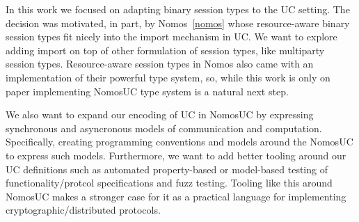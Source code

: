 In this work we focused on adapting binary session types to the UC setting. The decision was motivated, in part, by Nomos~\ref{nomos} whose resource-aware binary session types
fit nicely into the import mechanism in UC.
We want to explore adding import on top of other formulation of session types, like multiparty session types.
Resource-aware session types in Nomos also came with an implementation of their powerful type system, so, while this work is only on paper implementing NomosUC type system is a natural next step.

We also want to expand our encoding of UC in NomosUC by expressing synchronous and asyncronous models of communication and computation. 
Specifically, creating programming conventions and models around the NomosUC to express such models.
Furthermore, we want to add better tooling around our UC definitions such as automated property-based or model-based testing of functionality/protcol specifications and fuzz testing. 
Tooling like this around NomosUC makes a stronger case for it as a practical language for implementing cryptographic/distributed protocols.
